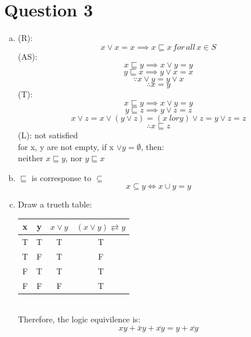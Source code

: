 \documentclass[11pt, a4paper]{article}
\begin{document}
\section*{Question 3}
\begin{enumerate}[(a)]
    \item
    (R):
    $$ x \lor x = x \implies x \sqsubseteq x \,  for\, all\, x \in S $$
    (AS):
    $$ x \sqsubseteq y \implies x \lor y = y $$
    $$ y \sqsubseteq x \implies y \lor x = x $$
    $$ \because x \lor y =y \lor x$$
    $$ \therefore x =y $$
    (T):
    $$ x \sqsubseteq y \implies x \lor y = y $$
    $$ y \sqsubseteq z \implies y \lor z = z $$
    $$ x \lor z = x \lor (y \lor z) = (x \ lor y) \lor z = y \lor z = z $$
    $$ \therefore x \sqsubseteq z $$
    (L): not satisfied\\
    for x, y are not empty, if x $\lor y = \emptyset $, then:\\
    neither $x \sqsubseteq y$, nor $ y \sqsubseteq x $
    \item
    $ \sqsubseteq $ is corresponse to $ \subseteq $
    $$ x \subseteq y \iff x \cup y = y $$
    \item
    Draw a trueth table:\\
    \begin{tabular}{ | c | c | c | c |}
        \hline
        x & y & $x \lor y$ & $ (x \lor y ) \rightleftarrows y$\\
        \hline
        T & T & T & T\\
        \hline
        T & F & T & F\\
        \hline
        F & T & T & T\\
        \hline
        F & F & F & T\\
        \hline
        \end{tabular}\\
        Therefore, the logic equivilence is:
        $$ xy + \bar{x}y + \overline{xy} = y + \overline{xy}$$
\end{enumerate}
\end{document}
